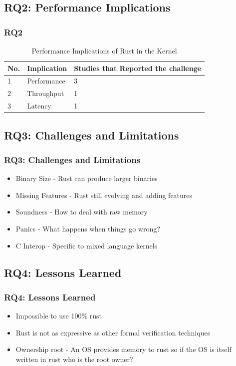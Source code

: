 \documentclass{beamer}
\begin{document}
\subsection{RQ2: Performance Implications}
\begin{frame}
  \frametitle{RQ2}
  \begin{table}
    \caption{Performance Implications of Rust in the Kernel}
    \begin{tabular}{||l|l|l||}
      \hline
      No. & Implication & Studies that Reported the challenge\\
      \hline\hline
      1 & Performance & 3\\
      2 & Throughput & 1\\
      3 & Latency & 1 \\
      \hline
    \end{tabular}
    \label{tab:RQ2}
  \end{table}
\end{frame}


\subsection{RQ3: Challenges and Limitations}
\begin{frame}
  \frametitle{RQ3: Challenges and Limitations}
  \begin{itemize}
  \item<1-> Binary Size - Rust can produce larger binaries
  \item<2-> Missing Features - Rust still evolving and adding features
  \item<3-> Soundness - How to deal with raw memory
  \item<4-> Panics - What happens when things go wrong?
  \item<5-> C Interop - Specific to mixed language kernels
  \end{itemize}
\end{frame}

\subsection{RQ4: Lessons Learned}

\begin{frame}
  \frametitle{RQ4: Lessons Learned}
  \begin{itemize}
  \item<1-> Impossible to use 100$\%$ rust
  \item<2-> Rust is not as expressive as other formal verification techniques
  \item<3-> Ownership root - An OS provides memory to rust so if the OS is itself written in rust
    who is the root owner?
  \end{itemize}

\end{frame}
\end{document}
